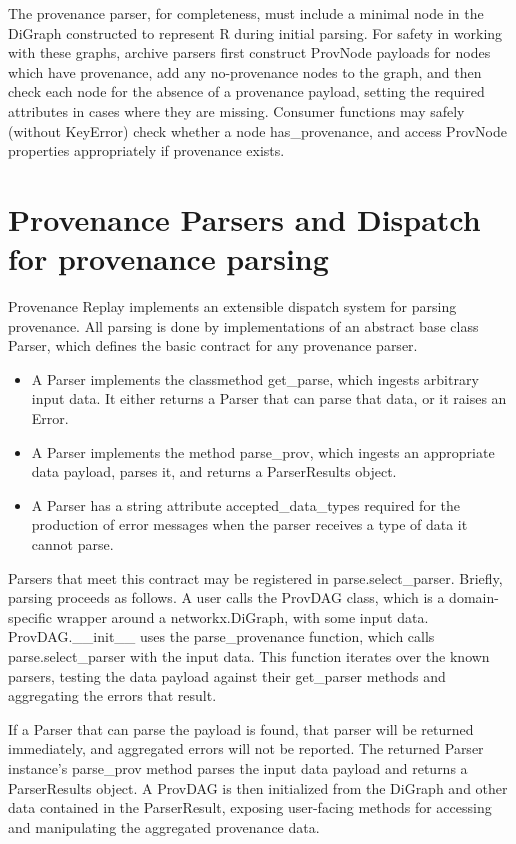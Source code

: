 The provenance parser, for completeness, must include a minimal node in the
DiGraph constructed to represent R during initial parsing. For safety in working
with these graphs, archive parsers first construct ProvNode payloads for nodes
which have provenance, add any no-provenance nodes to the graph, and then check
each node for the absence of a provenance payload, setting the required
attributes in cases where they are missing. Consumer functions may safely
(without KeyError) check whether a node has\_provenance, and access ProvNode
properties appropriately if provenance exists.

\section{Provenance Parsers and Dispatch for provenance parsing}

Provenance Replay implements an extensible dispatch system for parsing
provenance. All parsing is done by implementations of an abstract base class
Parser, which defines the basic contract for any provenance parser. 
\begin{itemize}
    \item A Parser implements the classmethod get\_parse, which ingests arbitrary input data. It either returns a Parser that can parse that data, or it raises an Error.
    \item A Parser implements the method parse\_prov, which ingests an appropriate data payload, parses it, and returns a ParserResults object.
    \item A Parser has a string attribute accepted\_data\_types required for the production of error messages when the parser receives a type of data it cannot parse.
\end{itemize}

Parsers that meet this contract may be registered in parse.select\_parser.
Briefly, parsing proceeds as follows. A user calls the ProvDAG class, which is a
domain-specific wrapper around a networkx.DiGraph, with some input data.
ProvDAG.\_\_init\_\_ uses the parse\_provenance function, which calls
parse.select\_parser with the input data. This function iterates over the known
parsers, testing the data payload against their get\_parser methods and
aggregating the errors that result. 

If a Parser that can parse the payload is found, that parser will be returned
immediately, and aggregated errors will not be reported. The returned Parser
instance’s parse\_prov method parses the input data payload and returns a
ParserResults object. A ProvDAG is then initialized from the DiGraph and other
data contained in the ParserResult, exposing user-facing methods for accessing
and manipulating the aggregated provenance data.

